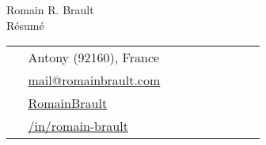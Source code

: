 \documentclass[10pt]{article} %
\begin{document}
\begin{paracol}{2} %
%
%
\parbox[top][0.12\textheight][c]{\linewidth}{ %
    \vspace{-2cm} %
    \centering %
    {\sffamily\Huge Romain R. Brault}\\\medskip %
    {\Huge\color{headings}\cvtextfont R\'esum\'e}
}
\switchcolumn %
%
%
\parbox[top][0.12\textheight][c]{\linewidth}{ %
    \vspace{-2cm} %
    \colorbox{shade}{ %
        \begin{supertabular}{p{0.05\linewidth}|p{0.775\linewidth}} %
            \raisebox{-1pt}{\faHome} &
                Antony (92160),
                France\\ %
            \raisebox{0pt}{\small\faEnvelope} &
                \href{mailto:mail@romainbrault.com}{ %
                      mail@romainbrault.com} \\ %
            \raisebox{-1pt}{\faGithub} &
                \href{https://github.com/RomainBrault}{ %
                      RomainBrault} \\ %
            \raisebox{-1pt}{\faLinkedinSquare} &
                \href{https://www.linkedin.com/in/romain-brault}{ %
                      /in/romain-brault} \\ %
        \end{supertabular}
    }
}
\end{paracol}
\end{document}
